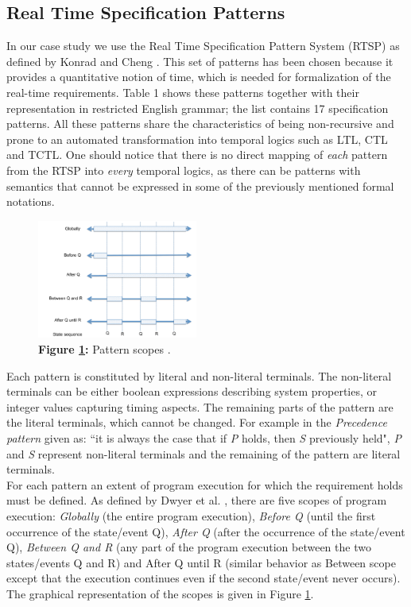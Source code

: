 \documentclass[conference]{IEEEtran}
\begin{document}
\subsection{Real Time Specification Patterns}

In our case study we use the Real Time Specification Pattern System (RTSP) as defined by Konrad and Cheng \cite{Konrad05sps}. This set of patterns has been chosen because it provides a quantitative notion of time, which is needed for formalization of the real-time requirements. Table 1 shows these patterns together with their representation in restricted English grammar; the list contains 17 specification patterns.
All these patterns share the characteristics of being non-recursive and prone to an automated transformation into temporal logics such as LTL, CTL and TCTL. One should notice that there is no direct mapping of \textit{each} pattern from the RTSP into \textit{every} temporal logics, as there can be patterns with semantics that cannot be expressed in some of the previously mentioned formal notations.

\begin{figure}
  \centering
    \includegraphics[width=0.47\textwidth]{pattern_scopes_corrected.pdf}
      \caption{\textbf{Figure \ref{fig:patternScopes}:} Pattern scopes \cite{Post12bosch}.}
      \label{fig:patternScopes}
\end{figure}

Each pattern is constituted by literal and non-literal terminals. The non-literal terminals can be either boolean expressions describing system properties, or integer values capturing timing aspects. The remaining parts of the pattern are the literal terminals, which cannot be changed. For example in the \textit{Precedence pattern} given as: ``it is always the case that if \textit{P} holds, then \textit{S} previously held", \textit{P} and \textit{S} represent non-literal terminals and the remaining of the pattern are literal terminals.\\
For each pattern an extent of program execution for which the requirement holds must be defined. As defined by Dwyer et al. \cite{Dwyer99sps}, there are five scopes of program execution: \textit{Globally} (the entire program execution), \textit{Before Q} (until the first occurrence of the state/event Q), \textit{After Q} (after the occurrence of the state/event Q), \textit{Between Q and R} (any part of the program execution between the two states/events Q and R) and After Q until R (similar behavior as Between scope except that the execution continues even if the second state/event never occurs). The graphical representation of the scopes is given in Figure \ref{fig:patternScopes}.
\end{document}
